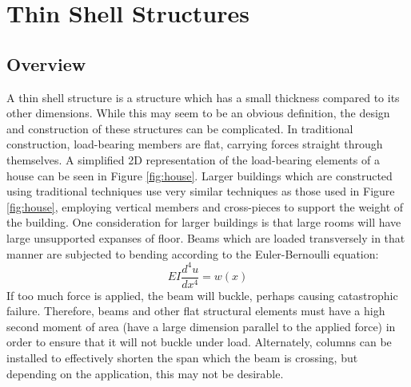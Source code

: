 \documentclass{thesis}
\begin{document}

\section{Thin Shell Structures} \label{thinshell}

\subsection{Overview}
A thin shell structure is a structure which has a small thickness compared to its other dimensions.  While this may seem to be
an obvious definition, the design and construction of these structures can be complicated.  In traditional construction, load-bearing
members are flat, carrying forces straight through themselves.  A simplified 2D representation of the load-bearing elements of a house
can be seen in Figure \ref{fig:house}.  Larger buildings which are constructed using traditional techniques use very similar techniques
as those used in Figure \ref{fig:house}, employing vertical members and cross-pieces to support the weight of the building.  One
consideration for larger buildings is that large rooms will have large unsupported expanses of floor.  Beams which are loaded transversely
in that manner are subjected to bending according to the Euler-Bernoulli equation: \[EI\frac{d^4u}{dx^4}=w(x)\]
If too much force is applied, the beam will buckle, perhaps causing catastrophic failure.  Therefore, beams and other flat structural
elements must have a high second moment of area (have a large dimension parallel to the applied force) in order to ensure that it will not
buckle under load.  Alternately, columns can be installed to effectively shorten the span which the beam is crossing, but depending on the
application, this may not be desirable.
\end{document}
